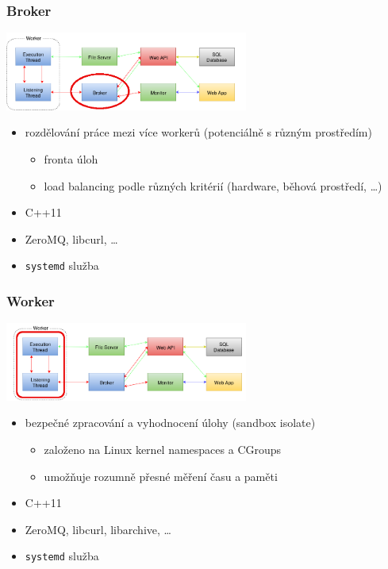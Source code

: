 \documentclass{beamer}
\begin{document}
\begin{frame}
	\frametitle{Broker}
	\begin{center}
		\includegraphics[width=0.6\textwidth]{images/communication-broker.png}
	\end{center}
	\begin{itemize}
		\item rozdělování práce mezi více workerů (potenciálně s různým prostředím)
			\begin{itemize}
				\item fronta úloh
				\item load balancing podle různých kritérií (hardware, běhová prostředí, \dots)
			\end{itemize}
		\item C++11
		\item ZeroMQ, libcurl, \dots
		\item \texttt{systemd} služba
	\end{itemize}
\end{frame}

\begin{frame}
	\frametitle{Worker}
	\begin{center}
		\includegraphics[width=0.6\textwidth]{images/communication-worker.png}
	\end{center}
	\begin{itemize}
		\item bezpečné zpracování a vyhodnocení úlohy (sandbox isolate)
			\begin{itemize}
				\item založeno na Linux kernel namespaces a CGroups
				\item umožňuje rozumně přesné měření času a paměti
			\end{itemize}
		\item C++11
		\item ZeroMQ, libcurl, libarchive, \dots
		\item \texttt{systemd} služba
	\end{itemize}
\end{frame}
\end{document}
